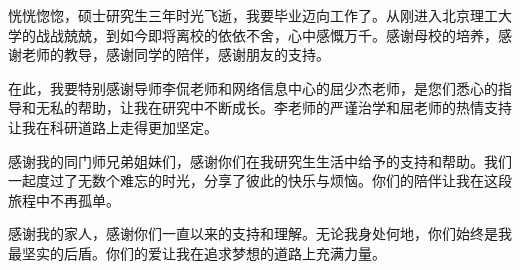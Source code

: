 %
%
%
%

\begin{acknowledgements}

恍恍惚惚，硕士研究生三年时光飞逝，我要毕业迈向工作了。从刚进入北京理工大学的战战兢兢，到如今即将离校的依依不舍，心中感慨万千。感谢母校的培养，感谢老师的教导，感谢同学的陪伴，感谢朋友的支持。

在此，我要特别感谢导师李侃老师和网络信息中心的屈少杰老师，是您们悉心的指导和无私的帮助，让我在研究中不断成长。李老师的严谨治学和屈老师的热情支持让我在科研道路上走得更加坚定。

感谢我的同门师兄弟姐妹们，感谢你们在我研究生生活中给予的支持和帮助。我们一起度过了无数个难忘的时光，分享了彼此的快乐与烦恼。你们的陪伴让我在这段旅程中不再孤单。

感谢我的家人，感谢你们一直以来的支持和理解。无论我身处何地，你们始终是我最坚实的后盾。你们的爱让我在追求梦想的道路上充满力量。

\end{acknowledgements}
